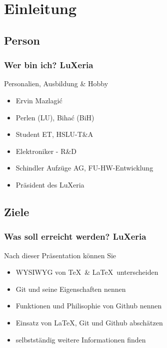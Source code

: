 \section{Einleitung}

\subsection{Person}
\begin{frame}
    \frametitle{Wer bin ich? \hfill{} \footnotesize{LuXeria}}
    \begin{block}{Personalien, Ausbildung \& Hobby}
        \begin{itemize}
            \item Ervin Mazlagi\'c
            \item Perlen (LU), Biha\'c (BiH)
            \item Student ET, HSLU-T\&A
            \item Elektroniker - R\&D
            \item Schindler Aufzüge AG, FU-HW-Entwicklung
            \item Präsident des LuXeria
        \end{itemize}
    \end{block}
\end{frame}

\subsection{Ziele}
\begin{frame}
    \frametitle{Was soll erreicht werden? \hfill{} \footnotesize{LuXeria}}
    \begin{block}{Nach dieser Präsentation können Sie}
        \begin{itemize}
            \item WYSIWYG von \TeX~\& \LaTeX~unterscheiden
            \item Git und seine Eigenschaften nennen
            \item Funktionen und Philisophie von Github nennen
            \item Einsatz von \LaTeX, Git und Github abschätzen
            \item selbstständig weitere Informationen finden
        \end{itemize}
    \end{block}
\end{frame}

